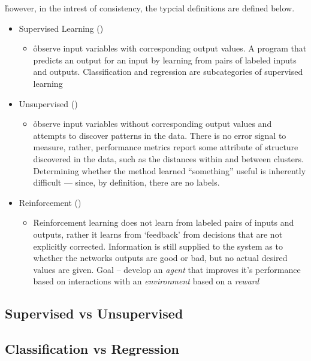 \r{however, in the intrest of consistency, the typcial definitions are defined below.}
\begin{itemize}[noitemsep,topsep=0pt]
	\item Supervised Learning (\ALR)
	\begin{itemize}[noitemsep,topsep=0pt]
		\item \r{observe input variables with corresponding output values. A program that predicts an output for an input by learning from pairs of labeled inputs and outputs. Classification \ALR and regression \ALR are subcategories of supervised learning}
	\end{itemize}
	\item Unsupervised (\ALR)
	\begin{itemize}[noitemsep,topsep=0pt]
		\item \r{observe input variables without corresponding output values and attempts to discover patterns in the data. There is no error signal to measure, rather, performance metrics report some attribute of structure discovered in the data, such as the distances within and between clusters. Determining whether the method learned ``something'' useful is inherently difficult --- since, by definition, there are no labels.}
	\end{itemize}
	\item{Reinforcement (\ALR)}
	\begin{itemize}[noitemsep,topsep=0pt]
		\item \r{Reinforcement learning does not learn from labeled pairs of inputs and outputs, rather it learns from `feedback' from decisions that are not explicitly corrected. Information is still supplied to the system as to whether the networks outputs are good or bad, but no actual desired values are given. Goal -- develop an \emph{agent} that improves it's performance based on interactions with an \emph{environment} based on a \emph{reward}}
	\end{itemize}
\end{itemize}


\subsection{Supervised vs Unsupervised}

\subsection{Classification vs Regression}

